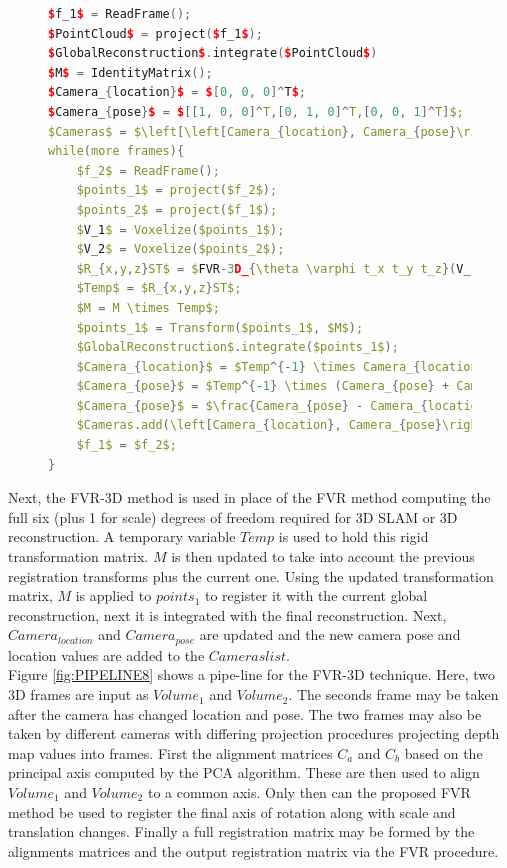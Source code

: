 \begin{figure}
\begin{lstlisting}[language=c++,caption=Phase Correlation Based SLAM Algorithm,label=algorithm:FVR3DSLAM,mathescape,basicstyle=\ttfamily]
$f_1$ = ReadFrame();
$PointCloud$ = project($f_1$);
$GlobalReconstruction$.integrate($PointCloud$)
$M$ = IdentityMatrix();
$Camera_{location}$ = $[0, 0, 0]^T$;
$Camera_{pose}$ = $[[1, 0, 0]^T,[0, 1, 0]^T,[0, 0, 1]^T]$;
$Cameras$ = $\left[\left[Camera_{location}, Camera_{pose}\right] \right]$;
while(more frames){
	$f_2$ = ReadFrame();
	$points_1$ = project($f_2$);
	$points_2$ = project($f_1$);
	$V_1$ = Voxelize($points_1$);
	$V_2$ = Voxelize($points_2$);
	$R_{x,y,z}ST$ = $FVR-3D_{\theta \varphi t_x t_y t_z}(V_1, V_2)$;
	$Temp$ = $R_{x,y,z}ST$;
	$M = M \times Temp$;
	$points_1$ = Transform($points_1$, $M$);
	$GlobalReconstruction$.integrate($points_1$);
	$Camera_{location}$ = $Temp^{-1} \times Camera_{location}$;
	$Camera_{pose}$ = $Temp^{-1} \times (Camera_{pose} + Camera_{location})$;
	$Camera_{pose}$ = $\frac{Camera_{pose} - Camera_{location}}{Camera_{pose} - Camera_{location}}$;
	$Cameras.add(\left[Camera_{location}, Camera_{pose}\right])$;
	$f_1$ = $f_2$;
}
\end{lstlisting}
\end{figure}

Next, the FVR-3D method is used in place of the FVR method computing the full six (plus 1 for scale) degrees of freedom required for 3D SLAM or 3D reconstruction. A temporary variable $Temp$ is used to hold this rigid transformation matrix. $M$ is then updated to take into account the previous registration transforms plus the current one. Using the updated transformation matrix, $M$ is applied to $points_1$ to register it with the current global reconstruction, next it is integrated with the final reconstruction. Next, $Camera_{location}$ and $Camera_{pose}$ are updated and the new camera pose and location values are added to the $Cameras list$. \\



Figure \ref{fig:PIPELINE8} shows a pipe-line for the FVR-3D technique. Here, two 3D frames are input as $Volume_1$ and $Volume_2$. The seconds frame may be taken after the camera has changed location and pose. The two frames may also be taken by different cameras with differing projection procedures projecting depth map values into frames. First the alignment matrices $C_a$ and $C_b$ based on the principal axis computed by the PCA algorithm. These are then used to align $Volume_1$ and $Volume_2$ to a common axis. Only then can the proposed FVR method be used to register the final axis of rotation along with scale and translation changes. Finally a full registration matrix may be formed by the alignments matrices and the output registration matrix via the FVR procedure. \\

